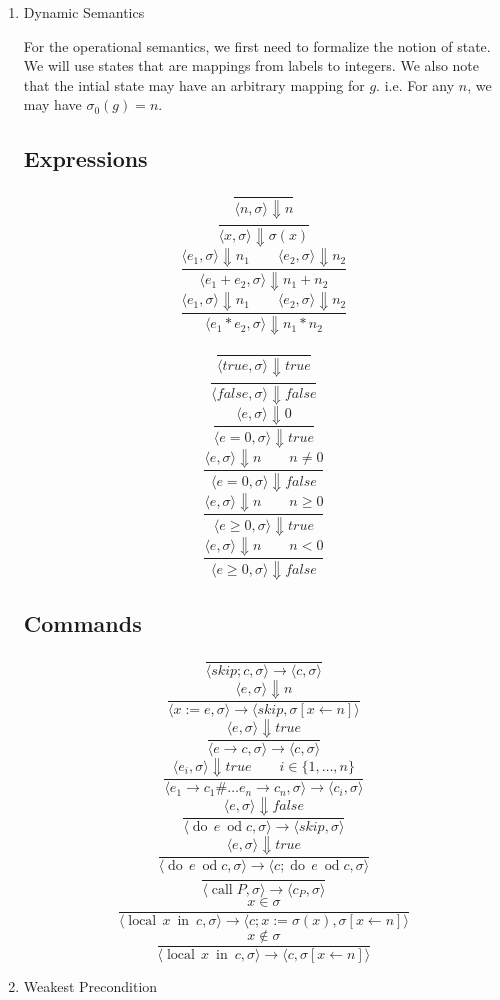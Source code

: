 \documentclass{article}
\newcommand{\dood}[1]{\operatorname{do}\, #1\ \operatorname{od}}
\newcommand{\callP}{\operatorname{call} P}
\newcommand{\localin}[2]{\operatorname{local}\, #1\ \operatorname{in}\ #2}
\begin{document}
\begin{enumerate}
  \item Dynamic Semantics
\newcommand{\bigstep}[3]{\langle #1, #2 \rangle \Downarrow #3}
\newcommand{\smallstep}[4]{\langle #1, #2 \rangle \rightarrow \langle #3, #4 \rangle}

    For the operational semantics, we first need to formalize the notion of
    state.  We will use states that are mappings from labels to integers. We also note that the intial state may have an arbitrary mapping for $g$.  i.e. For any $n$, we may have $\sigma_0(g) = n$.
\subsection*{Expressions}
\[\frac{}
{\bigstep{n}{\sigma}{ n}}
\]
\[\frac{}
{\bigstep{x}{\sigma}{\sigma(x)}}
\]
\[\frac{\bigstep{e_1}{\sigma}{n_1} \qquad \bigstep{e_2}{\sigma}{n_2}}
{\bigstep{e_1 + e_2}{\sigma}{n_1 + n_2}}
\]
\[\frac{\bigstep{e_1}{\sigma}{n_1} \qquad \bigstep{e_2}{\sigma}{n_2}}
{\bigstep{e_1 * e_2}{\sigma}{n_1 * n_2}}
\]

\[\frac{}
{\bigstep{true}{\sigma}{true}}
\]
\[\frac{}
{\bigstep{false}{\sigma}{false}}
\]
\[\frac{\bigstep{e}{\sigma}{0}}
{\bigstep{e = 0}{\sigma}{ true }}
\]
\[\frac{\bigstep{e}{\sigma}{n} \qquad n \ne 0}
{\bigstep{e = 0}{\sigma}{false}}
\]
\[\frac{\bigstep{e}{\sigma}{n} \qquad n \ge 0}
{\bigstep{e \ge 0}{\sigma}{true}}
\]
\[\frac{\bigstep{e}{\sigma}{n} \qquad n < 0}
{\bigstep{e \ge 0}{\sigma}{false}}
\]


\subsection*{Commands}
\[\frac{}
{\smallstep{skip;c}{\sigma}{c}{\sigma}}
\]
\[\frac{\bigstep{e}{\sigma}{n}}
{\smallstep{x := e}{\sigma}{skip}{\sigma[x \gets n]}}
\]
\[\frac{\bigstep{e}{\sigma}{true}}
{\smallstep{e \rightarrow c}{\sigma}{c}{\sigma}}
\]
\[\frac{\bigstep{e_i}{\sigma}{true} \qquad i \in \{1,\dots,n\}}
{\smallstep{e_1 \rightarrow c_1 \# \dots e_n \rightarrow c_n}{\sigma}{c_i}{\sigma}}
\]
\[\frac{\bigstep{e}{\sigma}{false}}
{\smallstep{\dood{e}{c}}{\sigma}{skip}{\sigma}}
\]
\[\frac{\bigstep{e}{\sigma}{true}}
{\smallstep{\dood{e}{c}}{\sigma}{c;\dood{e}{c}}{\sigma}}
\]
\[\frac{}
{\smallstep{\callP}{\sigma}{c_P}{\sigma}}
\]
\[\frac{x \in \sigma}
{\smallstep{\localin{x}{c}}{\sigma}{c; x := \sigma(x) }{\sigma[x \gets n]}}
\]
\[\frac{x \not\in \sigma}
{\smallstep{\localin{x}{c}}{\sigma}{c}{\sigma[x \gets n]}}
\]

  \item Weakest Precondition
\end{enumerate}
\end{document}
